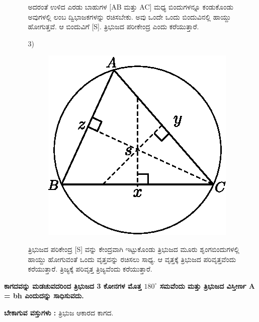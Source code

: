 \begin{enumerate}
\begin{itemize}
 
 ಅದರಂತೆ ಉಳಿದ ಎರಡು ಬಾಹುಗಳ [AB ಮತ್ತು  AC] ಮಧ್ಯ ಬಿಂದುಗಳನ್ನೂ ಕಂಡುಕೊಂಡು ಅವುಗಳಲ್ಲಿ ಲಂಬ ದ್ವಿಭಾಜಕಗಳನ್ನು ರಚಿಸಬೇಕು. ಅವು ಒಂದೇ ಒಂದು ಬಿಂದುವಿನಲ್ಲಿ ಹಾಯ್ದು ಹೋಗುತ್ತವೆ. ಆ ಬಿಂದುವಿಗೆ  [S]. ತ್ರಿಭುಜದ ಪರೀಕೇಂದ್ರ ಎಂದು ಕರೆಯುತ್ತಾರೆ. 
 
 
 \item[3)] 
 ~
 \begin{figure}[H]
\centering
\includegraphics[scale=.8]{src/figure/chap1/fig1-38c.eps}
\end{figure}
   ತ್ರಿಭುಜದ ಪರಿಕೇಂದ್ರ [S] ವನ್ನು ಕೇಂದ್ರವಾಗಿ ಇಟ್ಟುಕೊಂಡು ತ್ರಿಭುಜದ ಮೂರು ಶೃಂಗಬಿಂದುಗಳಲ್ಲಿ ಹಾಯ್ದು ಹೋಗುವಂತೆ ಒಂದು ವೃತ್ತವನ್ನು ರಚಿಸಲು ಸಾಧ್ಯ. ಆ ವೃತ್ತಕ್ಕೆ ತ್ರಿಭುಜದ ಪರಿವೃತ್ತವೆಂದು ಕರೆಯುತ್ತಾರೆ. ತ್ರಿಜ್ಯಕ್ಕೆ ಪರಿವೃತ್ತ  ತ್ರಿಜ್ಯವೆಂದು ಕರೆಯುತ್ತಾರೆ. 
  \end{itemize}
 \end{enumerate}

\medskip
\noindent
\textbf{ಕಾಗದವನ್ನು ಮಡಚುವದರಿಂದ ತ್ರಿಭುಜದ 3 ಕೋನಗಳ ಮೊತ್ತ $180^\circ$ ಸಮವೆಂದು ಮತ್ತು ತ್ರಿಭುಜದ ವಿಸ್ತೀರ್ಣ  A = bh ಎಂದುದನ್ನು ಸಾಧಿಸುವದು. }

\medskip
\noindent
\textbf{ಬೇಕಾಗುವ ವಸ್ತುಗಳು :} ತ್ರಿಭುಜ ಆಕಾರದ ಕಾಗದ. 


